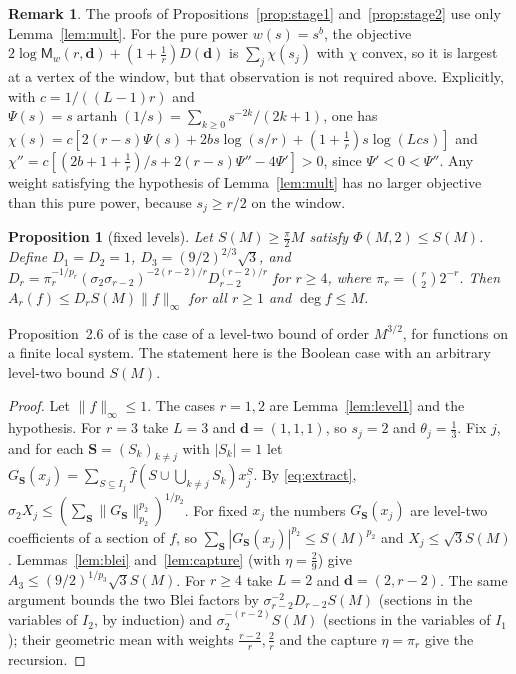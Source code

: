 \documentclass[11pt]{amsart}
\newtheorem{proposition}[theorem]{Proposition}
\theoremstyle{definition}
\newtheorem{remark}[theorem]{Remark}
\newcommand{\hf}{\widehat f}
\newcommand{\artanh}{\operatorname{artanh}}
\newcommand{\bd}{\mathbf d}
\begin{document}
\begin{remark}
The proofs of Propositions~\ref{prop:stage1} and~\ref{prop:stage2} use only Lemma~\ref{lem:mult}. For the pure power $w(s)=s^b$, the objective $2\log\mathsf M_w(r,\bd)+(1+\frac1r)D(\bd)$ is $\sum_j\chi(s_j)$ with $\chi$ convex, so it is largest at a vertex of the window, but that observation is not required above. Explicitly, with $c=1/((L-1)r)$ and $\Psi(s)=s\artanh(1/s)=\sum_{k\ge0}s^{-2k}/(2k+1)$, one has $\chi(s)=c[2(r-s)\Psi(s)+2bs\log(s/r)+(1+\frac1r)s\log(Lcs)]$ and $\chi''=c[(2b+1+\frac1r)/s+2(r-s)\Psi''-4\Psi']>0$, since $\Psi'<0<\Psi''$. Any weight satisfying the hypothesis of Lemma~\ref{lem:mult} has no larger objective than this pure power, because $s_j\ge r/2$ on the window.
\end{remark}

\begin{proposition}[fixed levels]\label{prop:fixed}
Let $S(M)\ge\frac\pi2M$ satisfy $\Phi(M,2)\le S(M)$. Define $D_1=D_2=1$, $D_3=(9/2)^{2/3}\sqrt3$, and $D_r=\pi_r^{-1/p_r}(\sigma_2\sigma_{r-2})^{-2(r-2)/r}D_{r-2}^{(r-2)/r}$ for $r\ge4$, where $\pi_r=\binom r22^{-r}$. Then $A_r(f)\le D_rS(M)\|f\|_\infty$ for all $r\ge1$ and $\deg f\le M$.
\end{proposition}

Proposition~2.6 of \cite{BNPR} is the case of a level-two bound of order $M^{3/2}$, for functions on a finite local system. The statement here is the Boolean case with an arbitrary level-two bound $S(M)$.

\begin{proof}
Let $\|f\|_\infty\le1$. The cases $r=1,2$ are Lemma~\ref{lem:level1} and the hypothesis. For $r=3$ take $L=3$ and $\bd=(1,1,1)$, so $s_j=2$ and $\theta_j=\frac13$. Fix $j$, and for each $\mathbf S=(S_k)_{k\ne j}$ with $|S_k|=1$ let $G_{\mathbf S}(x_j)=\sum_{S\subseteq I_j}\hf(S\cup\bigcup_{k\ne j}S_k)x_j^S$. By \eqref{eq:extract}, $\sigma_2X_j\le(\sum_{\mathbf S}\|G_{\mathbf S}\|_{p_2}^{p_2})^{1/p_2}$. For fixed $x_j$ the numbers $G_{\mathbf S}(x_j)$ are level-two coefficients of a section of $f$, so $\sum_{\mathbf S}|G_{\mathbf S}(x_j)|^{p_2}\le S(M)^{p_2}$ and $X_j\le\sqrt3S(M)$. Lemmas~\ref{lem:blei} and~\ref{lem:capture} (with $\eta=\frac29$) give $A_3\le(9/2)^{1/p_3}\sqrt3S(M)$. For $r\ge4$ take $L=2$ and $\bd=(2,r-2)$. The same argument bounds the two Blei factors by $\sigma_{r-2}^{-2}D_{r-2}S(M)$ (sections in the variables of $I_2$, by induction) and $\sigma_2^{-(r-2)}S(M)$ (sections in the variables of $I_1$); their geometric mean with weights $\frac{r-2}r,\frac2r$ and the capture $\eta=\pi_r$ give the recursion.
\end{proof}
\end{document}
